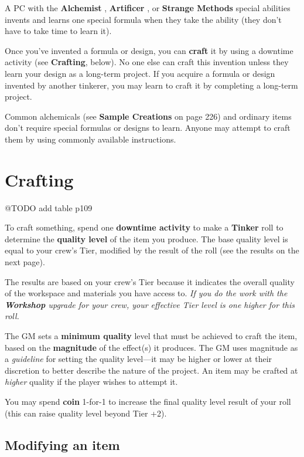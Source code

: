 \documentclass[11pt,fleqn,a5paper]{book}
\newcommand{\gameterm}[1]{\textbf{#1}}
\begin{document}
A PC with the \gameterm{Alchemist} , \gameterm{Artificer} , or \gameterm{Strange Methods}  special abilities invents and learns one special formula when they take the ability (they don’t have to take time to learn it).

Once you’ve invented a formula or design, you can \textbf{craft} it by using a downtime activity (see \textbf{Crafting}, below). No one else can craft this invention unless they learn your design as a long-term project. If you acquire a formula or design invented by another tinkerer, you may learn to craft it by completing a long-term project.

Common alchemicals (see \textbf{Sample Creations} on page 226) and ordinary items don’t require special formulas or designs to learn. Anyone may attempt to craft them by using commonly available instructions.

\section{Crafting}

@TODO add table p109

To craft something, spend one \textbf{downtime activity} to make a \gameterm{Tinker}  roll to determine the \textbf{quality level} of the item you produce. The base quality level is equal to your crew’s Tier, modified by the result of the roll (see the results on the next page).

The results are based on your crew’s Tier because it indicates the overall quality of the workspace and materials you have access to. \emph{If you do the work with the \textbf{Workshop} upgrade for your crew, your effective Tier level is one higher for this roll.}

The GM sets a \textbf{minimum quality} level that must be achieved to craft the item, based on the \textbf{magnitude} of the effect(s) it produces. The GM uses magnitude as a \emph{guideline} for setting the quality level---it may be higher or lower at their discretion to better describe the nature of the project. An item may be crafted at \emph{higher} quality if the player wishes to attempt it.

You may spend \gameterm{coin}  1-for-1 to increase the final quality level result of your roll (this can raise quality level beyond Tier +2).

\subsection{Modifying an item}
\end{document}
